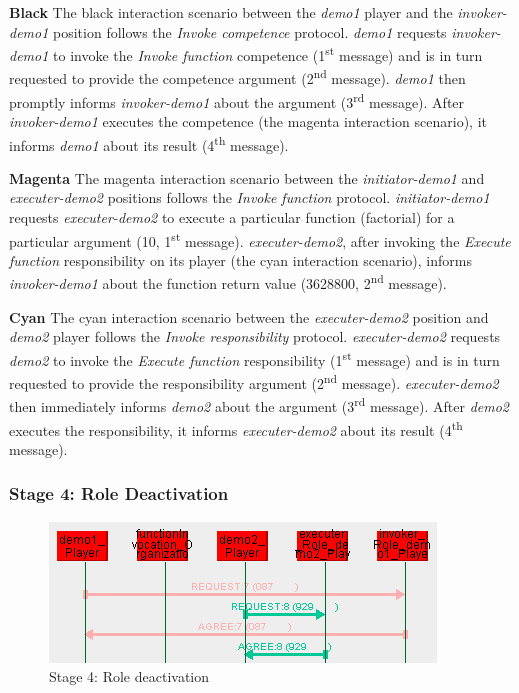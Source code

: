 \textbf{Black} The black interaction scenario between the \textit{demo1} player and the \textit{invoker-demo1} position follows the \textit{Invoke competence} protocol.
\textit{demo1} requests \textit{invoker-demo1} to invoke the \textit{Invoke function} competence (1\textsuperscript{st} message) and is in turn requested to provide the competence argument (2\textsuperscript{nd} message).
\textit{demo1} then promptly informs \textit{invoker-demo1} about the argument (3\textsuperscript{rd} message).
After \textit{invoker-demo1} executes the competence (the magenta interaction scenario), it informs \textit{demo1} about its result (4\textsuperscript{th} message).

\textbf{Magenta} The magenta interaction scenario between the \textit{initiator-demo1} and \textit{executer-demo2} positions follows the \textit{Invoke function} protocol.
\textit{initiator-demo1} requests \textit{executer-demo2} to execute a particular function (factorial) for a particular argument (10, 1\textsuperscript{st} message).
\textit{executer-demo2}, after invoking the \textit{Execute function} responsibility on its player (the cyan interaction scenario), informs \textit{invoker-demo1} about the function return value (3628800, 2\textsuperscript{nd} message).

\textbf{Cyan} The cyan interaction scenario between the \textit{executer-demo2} position and \textit{demo2} player follows the \textit{Invoke responsibility} protocol.
\textit{executer-demo2} requests \textit{demo2} to invoke the \textit{Execute function} responsibility (1\textsuperscript{st} message) and is in turn requested to provide the responsibility argument (2\textsuperscript{nd} message).
\textit{executer-demo2} then immediately informs \textit{demo2} about the argument (3\textsuperscript{rd} message).
After \textit{demo2} executes the responsibility, it informs \textit{executer-demo2} about its result (4\textsuperscript{th} message).

\subsubsection*{Stage 4: Role Deactivation}

\begin{figure}[H]
	\centering
	\includegraphics[width=\textwidth]{images/example1-stage4.png}
	\caption{Stage 4: Role deactivation}
	\label{figure:example1-stage4}
\end{figure}

